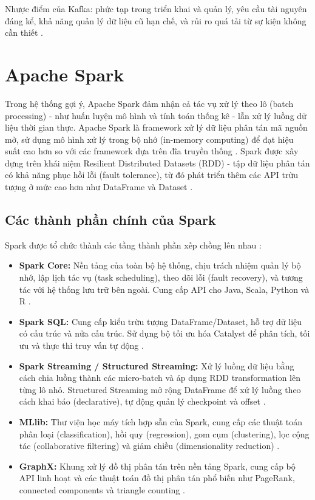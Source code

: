 \documentclass[../BTL.tex]{subfiles}
\begin{document}
Nhược điểm của Kafka: phức tạp trong triển khai và quản lý, yêu cầu tài nguyên đáng kể, khả năng quản lý dữ liệu cũ hạn chế, và rủi ro quá tải từ sự kiện không cần thiết \cite{kafka_official}.


\section{Apache Spark}
Trong hệ thống gợi ý, Apache Spark đảm nhận cả tác vụ xử lý theo lô (batch processing) - như huấn luyện mô hình và tính toán thống kê - lẫn xử lý luồng dữ liệu thời gian thực. Apache Spark là framework xử lý dữ liệu phân tán mã nguồn mở, sử dụng mô hình xử lý trong bộ nhớ (in-memory computing) để đạt hiệu suất cao hơn so với các framework dựa trên đĩa truyền thống \cite{spark_rdd, spark_definitive}. Spark được xây dựng trên khái niệm Resilient Distributed Datasets (RDD) - tập dữ liệu phân tán có khả năng phục hồi lỗi (fault tolerance), từ đó phát triển thêm các API trừu tượng ở mức cao hơn như DataFrame và Dataset \cite{spark_rdd, spark_sql}.

\subsection{Các thành phần chính của Spark}
Spark được tổ chức thành các tầng thành phần xếp chồng lên nhau \cite{spark_definitive, spark_official}:

\begin{itemize}
    \item \textbf{Spark Core:} Nền tảng của toàn bộ hệ thống, chịu trách nhiệm quản lý bộ nhớ, lập lịch tác vụ (task scheduling), theo dõi lỗi (fault recovery), và tương tác với hệ thống lưu trữ bên ngoài. Cung cấp API cho Java, Scala, Python và R \cite{spark_rdd}.

    \item \textbf{Spark SQL:} Cung cấp kiểu trừu tượng DataFrame/Dataset, hỗ trợ dữ liệu có cấu trúc và nửa cấu trúc. Sử dụng bộ tối ưu hóa Catalyst để phân tích, tối ưu và thực thi truy vấn tự động \cite{spark_sql}.

    \item \textbf{Spark Streaming / Structured Streaming:} Xử lý luồng dữ liệu bằng cách chia luồng thành các micro-batch và áp dụng RDD transformation lên từng lô nhỏ. Structured Streaming mở rộng DataFrame để xử lý luồng theo cách khai báo (declarative), tự động quản lý checkpoint và offset \cite{spark_streaming, spark_structured_streaming}.

    \item \textbf{MLlib:} Thư viện học máy tích hợp sẵn của Spark, cung cấp các thuật toán phân loại (classification), hồi quy (regression), gom cụm (clustering), lọc cộng tác (collaborative filtering) và giảm chiều (dimensionality reduction) \cite{spark_mllib}.

    \item \textbf{GraphX:} Khung xử lý đồ thị phân tán trên nền tảng Spark, cung cấp bộ API linh hoạt và các thuật toán đồ thị phân tán phổ biến như PageRank, connected components và triangle counting \cite{spark_graphx}.
\end{itemize}
\end{document}
